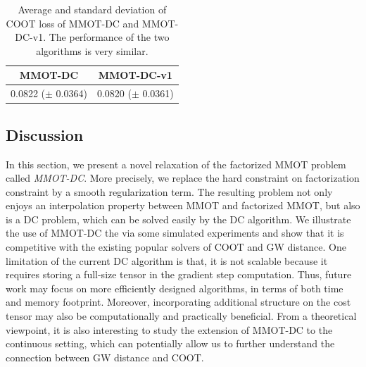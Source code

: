 \begin{table}[H]
  \label{tab:coot_new}
  \begin{center}
    \begin{small}
      \begin{sc}
        \begin{tabular}{|c|c|}
          \hline
          MMOT-DC & MMOT-DC-v1 \\
          \hline
          0.0822 ($\pm$ 0.0364) & 0.0820 ($\pm$ 0.0361) \\
          \hline
        \end{tabular}
      \end{sc}
    \end{small}
  \end{center}
  \caption{Average and standard deviation of COOT loss of MMOT-DC and MMOT-DC-v1.
  The performance of the two algorithms is very similar.}
\end{table}

\subsection{Discussion}

In this section, we present a novel relaxation of the factorized MMOT problem called \textit{MMOT-DC}.
More precisely, we replace the
hard constraint on factorization constraint by a smooth regularization term. The resulting problem
not only enjoys an interpolation property between MMOT and factorized MMOT, but also is a DC problem,
which can be solved easily by the DC algorithm. We illustrate the use of MMOT-DC the via some simulated experiments and show that
it is competitive with the existing popular solvers of COOT and GW distance.
One limitation of the current DC algorithm is that, it is not scalable because
it requires storing a full-size tensor in the gradient step computation. Thus, future
work may focus on more efficiently designed algorithms, in terms of both time and memory footprint.
Moreover, incorporating additional structure on the cost tensor may also be computationally and practically beneficial.
From a theoretical viewpoint, it is also interesting to study the extension of MMOT-DC to the continuous setting,
which can potentially allow us to further understand the connection between GW distance and COOT.


